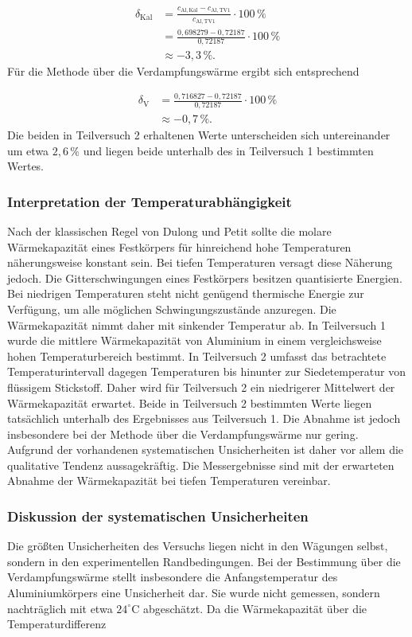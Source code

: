 \documentclass{report}
\begin{document}
\begin{align}
\delta_\mathrm{Kal}
&=
\frac{
c_\mathrm{Al,Kal}-c_\mathrm{Al,TV1}
}{
c_\mathrm{Al,TV1}
}
\cdot100\,\%\\
&=
\frac{
0{,}698279-0{,}72187
}{
0{,}72187
}
\cdot100\,\%\\
&\approx
-3{,}3\,\%.
\end{align}
\noindent
Für die Methode über die Verdampfungswärme ergibt sich entsprechend

\begin{align}
\delta_\mathrm{V}
&=
\frac{
0{,}716827-0{,}72187
}{
0{,}72187
}
\cdot100\,\%\\
&\approx
-0{,}7\,\%.
\end{align}
\noindent
Die beiden in Teilversuch 2 erhaltenen Werte unterscheiden sich untereinander
um etwa $2{,}6\,\%$ und liegen beide unterhalb des in Teilversuch 1 bestimmten
Wertes.


\subsubsection{Interpretation der Temperaturabhängigkeit}
\noindent
Nach der klassischen Regel von Dulong und Petit sollte die molare Wärmekapazität
eines Festkörpers für hinreichend hohe Temperaturen näherungsweise konstant sein.
Bei tiefen Temperaturen versagt diese Näherung jedoch.
\noindent
Die Gitterschwingungen eines Festkörpers besitzen quantisierte Energien. Bei
niedrigen Temperaturen steht nicht genügend thermische Energie zur Verfügung,
um alle möglichen Schwingungszustände anzuregen. Die Wärmekapazität nimmt daher
mit sinkender Temperatur ab.
\noindent
In Teilversuch 1 wurde die mittlere Wärmekapazität von Aluminium in einem
vergleichsweise hohen Temperaturbereich bestimmt. In Teilversuch 2 umfasst das
betrachtete Temperaturintervall dagegen Temperaturen bis hinunter zur
Siedetemperatur von flüssigem Stickstoff. Daher wird für Teilversuch 2 ein
niedrigerer Mittelwert der Wärmekapazität erwartet.
\noindent
Beide in Teilversuch 2 bestimmten Werte liegen tatsächlich unterhalb des
Ergebnisses aus Teilversuch 1. Die Abnahme ist jedoch insbesondere bei der
Methode über die Verdampfungswärme nur gering. Aufgrund der vorhandenen
systematischen Unsicherheiten ist daher vor allem die qualitative Tendenz
aussagekräftig. Die Messergebnisse sind mit der erwarteten Abnahme der
Wärmekapazität bei tiefen Temperaturen vereinbar.


\subsubsection{Diskussion der systematischen Unsicherheiten}
\noindent
Die größten Unsicherheiten des Versuchs liegen nicht in den Wägungen selbst,
sondern in den experimentellen Randbedingungen.
\noindent
Bei der Bestimmung über die Verdampfungswärme stellt insbesondere die
Anfangstemperatur des Aluminiumkörpers eine Unsicherheit dar. Sie wurde nicht
gemessen, sondern nachträglich mit etwa $24^\circ\mathrm{C}$ abgeschätzt.
Da die Wärmekapazität über die Temperaturdifferenz
\end{document}
